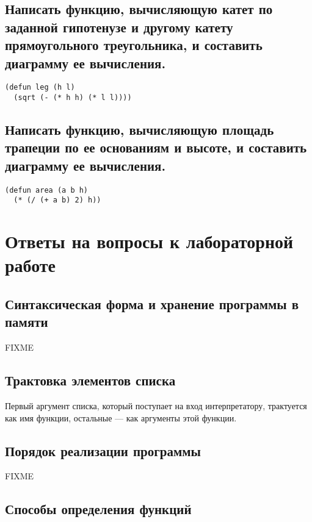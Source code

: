 \clearpage

\section{Написать функцию, вычисляющую катет по заданной гипотенузе и другому катету прямоугольного треугольника, и составить диаграмму ее вычисления.}

\begin{lstlisting}
(defun leg (h l)
  (sqrt (- (* h h) (* l l))))
\end{lstlisting}

\vspace{60mm}

\section{Написать функцию, вычисляющую площадь трапеции по ее основаниям и высоте, и составить диаграмму ее вычисления.}

\begin{lstlisting}
(defun area (a b h) 
  (* (/ (+ a b) 2) h))
\end{lstlisting}

\chapter{Ответы на вопросы к лабораторной работе}

\section{Синтаксическая форма и хранение программы в памяти}

FIXME

\section{Трактовка элементов списка}

Первый аргумент списка, который поступает на вход интерпретатору, трактуется как имя функции, остальные --- как аргументы этой функции.

\section{Порядок реализации программы}

FIXME

\section{Способы определения функций}

